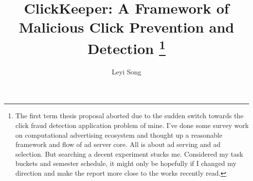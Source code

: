 \documentclass[runningheads,report]{llncs}
\begin{document}
\mainmatter  %

\title{ClickKeeper: A Framework of  Malicious Click Prevention and Detection
\thanks{The first term thesis proposal aborted due to the sudden switch towards the click fraud detection application problem of mine. I've done some survey work on computational advertising ecosystem and thought up a reasonable framework and flow of ad server core. All is about ad serving and ad selection. But searching a decent experiment stucks me.  Considered my task buckets and semester schedule, it might only be hopefully if I changed my direction and make the report more close to the works recently read.
}
}


%
%
\author{Leyi Song}
%


%
%

\maketitle
\end{document}
